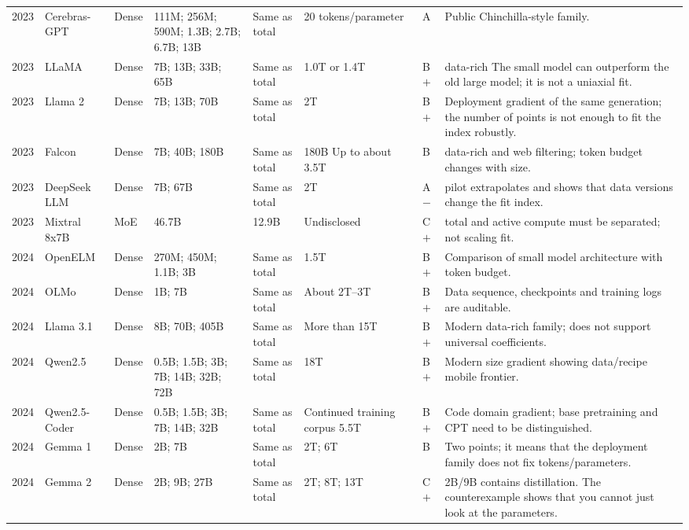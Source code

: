 \documentclass[UTF8,10pt,a4paper,fontset=none]{ctexart}
\begin{document}
\begin{longtable}{C{0.55cm}p{1.50cm}p{1.10cm}p{3.20cm}p{2.00cm}p{1.80cm}C{0.65cm}p{3.80cm}}
2023 & Cerebras-GPT\cite{en:cerebrasgpt2023} & Dense & 111M; 256M; 590M; 1.3B; 2.7B; 6.7B; 13B & Same as total & 20 tokens/parameter & A & Public Chinchilla-style family. \\
2023 & LLaMA\cite{en:llama2023} & Dense & 7B; 13B; 33B; 65B & Same as total & 1.0T or 1.4T & B$+$ & data-rich The small model can outperform the old large model; it is not a uniaxial fit. \\
2023 & Llama 2\cite{en:llama2} & Dense & 7B; 13B; 70B & Same as total & 2T & B$+$ & Deployment gradient of the same generation; the number of points is not enough to fit the index robustly. \\
2023 & Falcon\cite{en:falcon2023} & Dense & 7B; 40B; 180B & Same as total & 180B Up to about 3.5T & B & data-rich and web filtering; token budget changes with size. \\
2023 & DeepSeek LLM\cite{en:deepseekllm2024} & Dense & 7B; 67B & Same as total & 2T & A$-$ & pilot extrapolates and shows that data versions change the fit index. \\
2023 & Mixtral 8x7B\cite{en:mixtral2024} & MoE & 46.7B & 12.9B & Undisclosed & C$+$ & total and active compute must be separated; not scaling fit. \\
2024 & Open\allowbreak ELM\cite{en:openelm2024} & Dense & 270M; 450M; 1.1B; 3B & Same as total & 1.5T & B$+$ & Comparison of small model architecture with token budget. \\
2024 & OLMo\cite{en:olmo2024} & Dense & 1B; 7B & Same as total & About 2T--3T & B$+$ & Data sequence, checkpoints and training logs are auditable. \\
2024 & Llama 3.1\cite{en:llama31} & Dense & 8B; 70B; 405B & Same as total & More than 15T & B$+$ & Modern data-rich family; does not support universal coefficients. \\
2024 & Qwen2.5\cite{en:qwen25} & Dense & 0.5B; 1.5B; 3B; 7B; 14B; 32B; 72B & Same as total & 18T & B$+$ & Modern size gradient showing data/recipe mobile frontier. \\
2024 & Qwen2.5-Coder\cite{en:qwen25coder} & Dense & 0.5B; 1.5B; 3B; 7B; 14B; 32B & Same as total & Continued training corpus 5.5T & B$+$ & Code domain gradient; base pretraining and CPT need to be distinguished. \\
2024 & Gemma 1\cite{en:gemma1} & Dense & 2B; 7B & Same as total & 2T; 6T & B & Two points; it means that the deployment family does not fix tokens/parameters. \\
2024 & Gemma 2\cite{en:gemma2} & Dense & 2B; 9B; 27B & Same as total & 2T; 8T; 13T & C$+$ & 2B/9B contains distillation. The counterexample shows that you cannot just look at the parameters. \\

\end{longtable}
\end{document}

